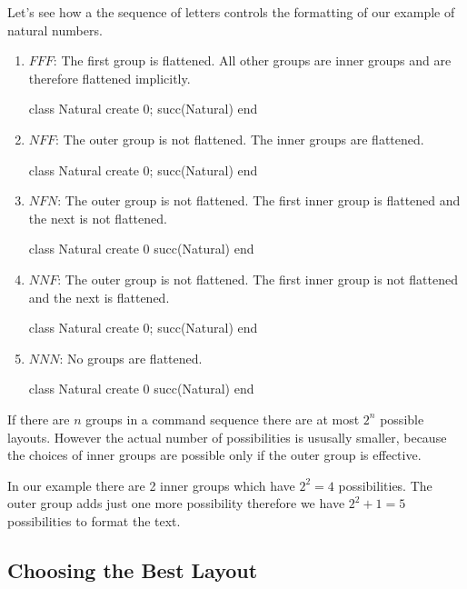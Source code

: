 \documentclass[12pt]{article}
\begin{document}
Let's see how a the sequence of letters controls the formatting of our example
of natural numbers.
\begin{enumerate}
\item $FFF$: The first group is flattened. All other groups are inner groups
  and are therefore flattened implicitly.
  \begin{alba}
    class Natural create 0; succ(Natural) end
  \end{alba}

\item $NFF$: The outer group is not flattened. The inner groups are flattened.
  \begin{alba}
    class Natural create
        0; succ(Natural)
    end
  \end{alba}

\item $NFN$: The outer group is not flattened. The first inner group is
  flattened and the next is not flattened.
  \begin{alba}
    class Natural create
        0
        succ(Natural)
    end
  \end{alba}

\item $NNF$: The outer group is not flattened. The first inner group is
  not flattened and the next is flattened.
  \begin{alba}
    class
        Natural
    create
        0; succ(Natural)
    end
  \end{alba}

\item $NNN$: No groups are flattened.
  \begin{alba}
    class
        Natural
    create
        0
        succ(Natural)
    end
  \end{alba}

\end{enumerate}

If there are $n$ groups in a command sequence there are at most $2^n$ possible
layouts. However the actual number of possibilities is ususally smaller,
because the choices of inner groups are possible only if the outer group is
effective.

In our example there are 2 inner groups which have $2^2 = 4$
possibilities. The outer group adds just one more possibility therefore we
have $2^2 + 1 = 5$ possibilities to format the text.


\subsection{Choosing the Best Layout}
\label{bestlayout}
\end{document}
